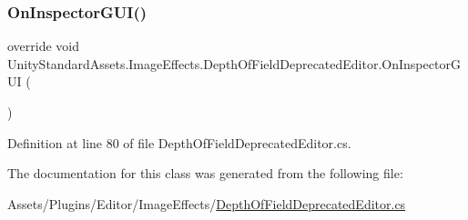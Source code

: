 \subsubsection{\texorpdfstring{On\+Inspector\+G\+U\+I()}{OnInspectorGUI()}}
{\footnotesize\ttfamily override void Unity\+Standard\+Assets.\+Image\+Effects.\+Depth\+Of\+Field\+Deprecated\+Editor.\+On\+Inspector\+G\+UI (\begin{DoxyParamCaption}{ }\end{DoxyParamCaption})}



Definition at line 80 of file Depth\+Of\+Field\+Deprecated\+Editor.\+cs.



The documentation for this class was generated from the following file\+:\begin{DoxyCompactItemize}
\item 
Assets/\+Plugins/\+Editor/\+Image\+Effects/\mbox{\hyperlink{_depth_of_field_deprecated_editor_8cs}{Depth\+Of\+Field\+Deprecated\+Editor.\+cs}}\end{DoxyCompactItemize}
